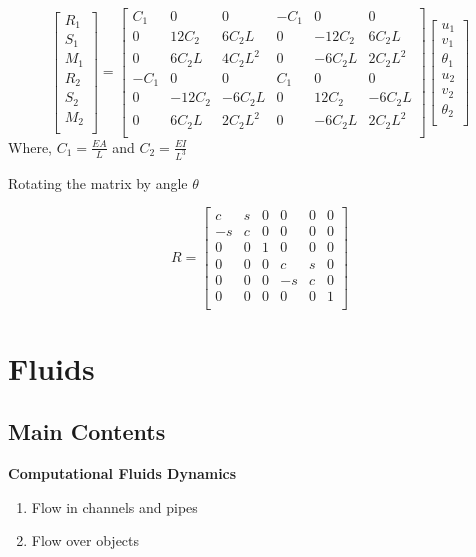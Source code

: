 \documentclass{report}
\begin{document}
\[
  \begin{bmatrix}
    R_1 \\ 
    S_1 \\
    M_1\\
    R_2 \\ 
    S_2 \\
    M_2\\
  \end{bmatrix}
  = 
  \begin{bmatrix}
    C_1 & 0 & 0 & -C_1 & 0 & 0 \\ 
    0 & 12C_2 & 6C_2L & 0 & -12C_2 & 6C_2L \\
    0 & 6C_2L & 4C_2L^2 & 0 & -6C_2L & 2C_2L^2 \\
    -C_1 & 0 & 0 & C_1 & 0 & 0 \\ 
    0 & -12C_2 & -6C_2L & 0 & 12C_2 & -6C_2L \\
    0 & 6C_2L & 2C_2L^2 & 0 & -6C_2L & 2C_2L^2 \\
  \end{bmatrix}
  \begin{bmatrix}
    u_1 \\ 
    v_1 \\ 
    \theta_1 \\
    u_2 \\ 
    v_2 \\ 
    \theta_2 \\
  \end{bmatrix}
\]
Where, $C_1 = \frac{EA}{L}$ and $C_2 = \frac{EI}{L^3}$

Rotating the matrix by angle $\theta$

\[
  R = \begin{bmatrix}
    c & s & 0 & 0 & 0 & 0 \\ 
    -s & c & 0 & 0 & 0 & 0 \\ 
    0 & 0 & 1 & 0 & 0 & 0 \\
    0 & 0 & 0 & c & s & 0 \\ 
    0 & 0 & 0 & -s & c & 0 \\ 
    0 & 0 & 0 & 0 & 0 & 1 \\
  \end{bmatrix}
\]

\chapter{Fluids}
\section{Main Contents}
\textbf{Computational Fluids Dynamics}
\begin{enumerate}
  \item Flow in channels and pipes
  \item Flow over objects 
\end{enumerate}
\end{document}
